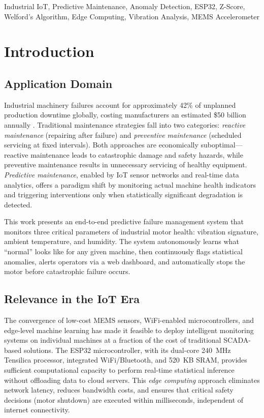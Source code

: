 \documentclass[conference]{IEEEtran}
\begin{document}
\begin{IEEEkeywords}
Industrial IoT, Predictive Maintenance, Anomaly Detection, ESP32, Z-Score, Welford's Algorithm, Edge Computing, Vibration Analysis, MEMS Accelerometer
\end{IEEEkeywords}

\section{Introduction}

\subsection{Application Domain}
Industrial machinery failures account for approximately 42\% of unplanned production downtime globally, costing manufacturers an estimated \$50 billion annually \cite{deloitte2022}. Traditional maintenance strategies fall into two categories: \textit{reactive maintenance} (repairing after failure) and \textit{preventive maintenance} (scheduled servicing at fixed intervals). Both approaches are economically suboptimal---reactive maintenance leads to catastrophic damage and safety hazards, while preventive maintenance results in unnecessary servicing of healthy equipment. \textit{Predictive maintenance}, enabled by IoT sensor networks and real-time data analytics, offers a paradigm shift by monitoring actual machine health indicators and triggering interventions only when statistically significant degradation is detected.

This work presents an end-to-end predictive failure management system that monitors three critical parameters of industrial motor health: vibration signature, ambient temperature, and humidity. The system autonomously learns what ``normal'' looks like for any given machine, then continuously flags statistical anomalies, alerts operators via a web dashboard, and automatically stops the motor before catastrophic failure occurs.

\subsection{Relevance in the IoT Era}
The convergence of low-cost MEMS sensors, WiFi-enabled microcontrollers, and edge-level machine learning has made it feasible to deploy intelligent monitoring systems on individual machines at a fraction of the cost of traditional SCADA-based solutions. The ESP32 microcontroller, with its dual-core 240~MHz Tensilica processor, integrated WiFi/Bluetooth, and 520~KB SRAM, provides sufficient computational capacity to perform real-time statistical inference without offloading data to cloud servers. This \textit{edge computing} approach eliminates network latency, reduces bandwidth costs, and ensures that critical safety decisions (motor shutdown) are executed within milliseconds, independent of internet connectivity.
\end{document}
